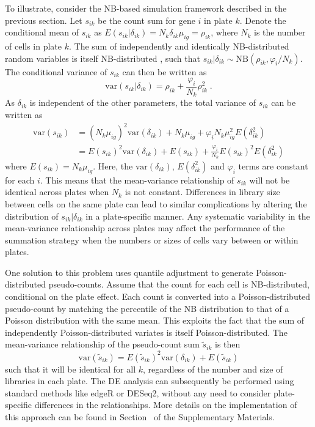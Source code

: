 \documentclass[oupdraft]{bio}
\begin{document}
To illustrate, consider the NB-based simulation framework described in the previous section.
Let $s_{ik}$ be the count sum for gene $i$ in plate $k$.
Denote the conditional mean of $s_{ik}$ as $E(s_{ik}|\delta_{ik})=N_k \delta_{ik}\mu_{ig} = \rho_{ik}$, where $N_k$ is the number of cells in plate $k$.
The sum of independently and identically NB-distributed random variables is itself NB-distributed \citep{robinson2008small}, 
    such that $s_{ik} |\delta_{ik} \sim \mbox{NB}(\rho_{ik}, \varphi_{i}/N_k)$.
The conditional variance of $s_{ik}$ can then be written as
\[
    \mbox{var}(s_{ik} |\delta_{ik}) = \rho_{ik} + \frac{\varphi_{i}}{N_k}\rho_{ik}^2 \;.
\]
As $\delta_{ik}$ is independent of the other parameters, the total variance of $s_{ik}$ can be written as
\begin{align*}
    \mbox{var}(s_{ik}) &= (N_k\mu_{ig})^2\mbox{var}(\delta_{ik}) + N_k\mu_{ig} + \varphi_{i} N_k\mu_{ig}^2 E(\delta_{ik}^2) \nonumber \\ 
                       &= E(s_{ik})^2 \mbox{var}(\delta_{ik}) + E(s_{ik}) + \frac{\varphi_{i}}{N_k} E(s_{ik})^2 E(\delta_{ik}^2) 
\end{align*}
where $E(s_{ik})=N_k\mu_{ig}$. 
Here, the $\mbox{var}(\delta_{ik})$, $E(\delta_{ik}^2)$ and $\varphi_{i}$ terms are constant for each $i$.
This means that the mean-variance relationship of $s_{ik}$ will not be identical across plates when $N_k$ is not constant.
Differences in library size between cells on the same plate can lead to similar complications by altering the distribution of $s_{ik} |\delta_{ik}$ in a plate-specific manner.
Any systematic variability in the mean-variance relationship across plates may affect the performance of the summation strategy when the numbers or sizes of cells vary between or within plates.

One solution to this problem uses quantile adjustment \citep{robinson2008small} to generate Poisson-distributed pseudo-counts.
Assume that the count for each cell is NB-distributed, conditional on the plate effect.
Each count is converted into a Poisson-distributed pseudo-count by matching the percentile of the NB distribution to that of a Poisson distribution with the same mean.
This exploits the fact that the sum of independently Poisson-distributed variates is itself Poisson-distributed.
The mean-variance relationship of the pseudo-count sum $\tilde{s}_{ik}$ is then
\[
    \mbox{var}(\tilde{s}_{ik}) = E(\tilde{s}_{ik})^2 \mbox{var}(\delta_{ik}) + E(\tilde{s}_{ik}) 
\]
such that it will be identical for all $k$, regardless of the number and size of libraries in each plate.
The DE analysis can subsequently be performed using standard methods like edgeR or DESeq2, without any need to consider plate-specific differences in the relationships.
More details on the implementation of this approach can be found in Section~\suppquantile{} of the Supplementary Materials.
\end{document}

